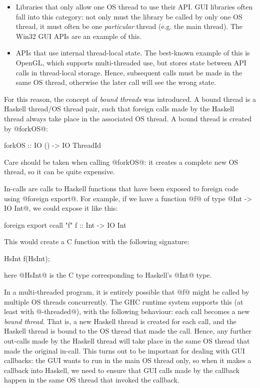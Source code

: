 \begin{itemize}
\item Libraries that only allow one OS thread to use their API.  GUI
  libraries often fall into this category: not only must the library
  be called by only one OS thread, it must often be one
  \emph{particular} thread (e.g. the main thread).  The Win32 GUI APIs
  are an example of this.

\item APIs that use internal thread-local state.  The best-known
  example of this is OpenGL, which supports multi-threaded use, but
  stores state between API calls in thread-local storage.  Hence,
  subsequent calls must be made in the same OS thread, otherwise the
  later call will see the wrong state.
\end{itemize}

For this reason, the concept of \emph{bound threads} was introduced.
A bound thread is a Haskell thread/OS thread pair, such that foreign
calls made by the Haskell thread always take place in the associated
OS thread.  A bound thread is created by @forkOS@:

\begin{haskell}
forkOS :: IO () -> IO ThreadId
\end{haskell}

\noindent Care should be taken when calling @forkOS@: it creates a
complete new OS thread, so it can be quite expensive.


In-calls are calls to Haskell functions that have been exposed to
foreign code using @foreign export@.  For example, if we have a
function @f@ of type @Int -> IO Int@, we could expose it like this:

\begin{haskell}
foreign export ccall "f" f :: Int -> IO Int
\end{haskell}

\noindent This would create a C function with the following signature:

\begin{haskell}
HsInt f(HsInt);
\end{haskell}

\noindent here @HsInt@ is the C type corresponding to Haskell's @Int@
type.

In a multi-threaded program, it is entirely possible that @f@ might be
called by multiple OS threads concurrently.  The GHC runtime system
supports this (at least with @-threaded@), with the following
behaviour: each call becomes a new \emph{bound thread}.  That is, a
new Haskell thread is created for each call, and the Haskell thread is
bound to the OS thread that made the call.  Hence, any further
out-calls made by the Haskell thread will take place in the same OS
thread that made the original in-call.  This turns out to be important
for dealing with GUI callbacks: the GUI wants to run in the main OS
thread only, so when it makes a callback into Haskell, we need to
ensure that GUI calls made by the callback happen in the same OS
thread that invoked the callback.

